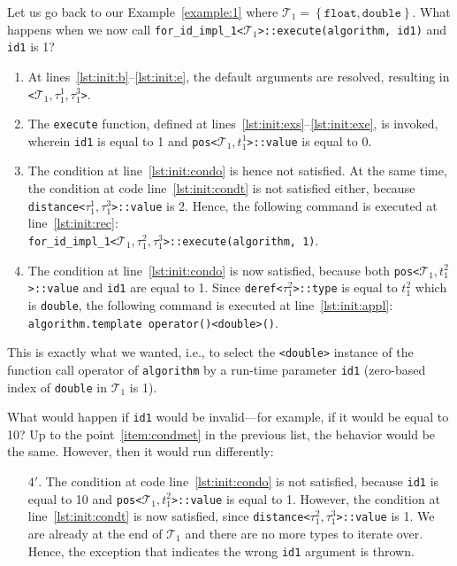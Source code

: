 \documentclass[10pt,a4paper]{article}
\theoremstyle{definition}\newtheorem{problem}{Problem}
\providecommand{\symtypeset}[1]{\ensuremath{\mathcal{T}_{#1}}}
\providecommand{\symtype}[2]{\ensuremath{t_{#1}^{#2}}}
\providecommand{\symiter}[2]{\ensuremath{\tau_{#1}^{#2}}}
\begin{document}
Let us go back to our Example~\ref{example:1} where $\symtypeset{1}=\left\{\mathtt{float,double}\right\}$. What happens when we now call \texttt{for\_id\_impl\_1<}\symtypeset{1}\texttt{>::execute(algorithm, id1)} and \texttt{id1} is 1?
\begin{enumerate}

\item At lines~\ref{lst:init:b}--\ref{lst:init:e}, the default arguments are resolved, resulting in \texttt{<}$\symtypeset{1},\symiter{1}{1},\symiter{1}{3}$\texttt{>}.

\item The \texttt{execute} function, defined at lines~\ref{lst:init:exs}--\ref{lst:init:exe}, is invoked, wherein \texttt{id1} is equal to 1 and \texttt{pos<}$\symtypeset{1},\symtype{1}{1}$\texttt{>::value} is equal to 0.

\item \label{item:condmet} The condition at line~\ref{lst:init:condo} is hence not satisfied. At the same time, the condition at code line~\ref{lst:init:condt} is not satisfied either, because \verb|distance<|$\symiter{1}{1},\symiter{1}{3}$\verb|>::value| is 2. Hence, the following command is executed at line~\ref{lst:init:rec}:\\ \texttt{for\_id\_impl\_1<}$\symtypeset{1},\symiter{1}{2},\symiter{1}{3}$\texttt{>::execute(algorithm, 1)}.

\item The condition at line~\ref{lst:init:condo} is now satisfied, because both \texttt{pos<}$\symtypeset{1},\symtype{1}{2}$\texttt{>::value} and \texttt{id1} are equal to 1. Since \texttt{deref<}\symiter{1}{2}\texttt{>::type} is equal to \symtype{1}{2} which is \texttt{double}, the following command is executed at line~\ref{lst:init:appl}:\\ \texttt{algorithm.template operator()<double>()}.

\end{enumerate}
This is exactly what we wanted, i.e., to select the \texttt{<double>} instance of the function call operator of \texttt{algorithm} by a run-time parameter \texttt{id1} (zero-based index of \texttt{double} in \symtypeset{1} is 1).

What would happen if \texttt{id1} would be invalid---for example, if it would be equal to 10? Up to the point~\ref{item:condmet} in the previous list, the behavior would be the same. However, then it would run differently:
\begin{enumerate}

\item[$4'$.] The condition at code line~\ref{lst:init:condo} is not satisfied, because \texttt{id1} is equal to 10 and \texttt{pos<}$\symtypeset{1},\symtype{1}{2}$\texttt{>::value} is equal to 1. However, the condition at line~\ref{lst:init:condt} is now satisfied, since \texttt{dis\-ta\-nce<}$\symiter{1}{2},\symiter{1}{3}$\verb|>::value| is 1. We are already at the end of \symtypeset{1} and there are no more types to iterate over. Hence, the exception that indicates the wrong \texttt{id1} argument is thrown.

\end{enumerate}
\end{document}
